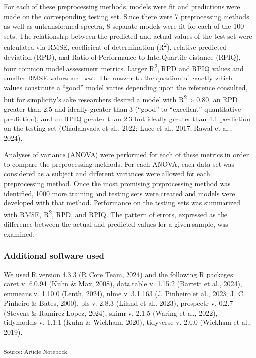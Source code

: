 \documentclass[
]{agujournal2019}
\begin{document}
For each of these preprocessing methods, models were fit and predictions
were made on the corresponding testing set. Since there were 7
preprocessing methods as well as untransformed spectra, 8 separate
models were fit for each of the 100 sets. The relationship between the
predicted and actual values of the test set were calculated via RMSE,
coefficient of determination (R\textsuperscript{2}), relative predicted
deviation (RPD), and Ratio of Performance to InterQuartile distance
(RPIQ), four common model assessment metrics. Larger
R\textsuperscript{2}, RPD and RPIQ values and smaller RMSE values are
best. The answer to the question of exactly which values constitute a
``good'' model varies depending upon the reference consulted, but for
simplicity's sake researchers desired a model with R\textsuperscript{2}
\textgreater{} 0.80, an RPD greater than 2.5 and ideally greater than 3
(``good'' to ``excellent'' quantitative prediction), and an RPIQ greater
than 2.3 but ideally greater than 4.1 prediction on the testing set
(Chadalavada et al., 2022; Luce et al., 2017; Rawal et al., 2024).

Analyses of variance (ANOVA) were performed for each of these metrics in
order to compare the preprocessing methods. For each ANOVA, each data
set was considered as a subject and different variances were allowed for
each preprocessing method. Once the most promising preprocessing method
was identified, 1000 more training and testing sets were created and
models were developed with that method. Performance on the testing sets
was summarized with RMSE, R\textsuperscript{2}, RPD, and RPIQ. The
pattern of errors, expressed as the difference between the actual and
predicted values for a given sample, was examined.

\subsubsection{Additional software used}\label{additional-software-used}

We used R version 4.3.3 (R Core Team, 2024) and the following R
packages: caret v. 6.0.94 (Kuhn \& Max, 2008), data.table v. 1.15.2
(Barrett et al., 2024), emmeans v. 1.10.0 (Lenth, 2024), nlme v. 3.1.163
(J. Pinheiro et al., 2023; J. C. Pinheiro \& Bates, 2000), pls v. 2.8.3
(Liland et al., 2023), prospectr v. 0.2.7 (Stevens \& Ramirez-Lopez,
2024), skimr v. 2.1.5 (Waring et al., 2022), tidymodels v. 1.1.1 (Kuhn
\& Wickham, 2020), tidyverse v. 2.0.0 (Wickham et al., 2019).

\textsubscript{Source:
\href{https://rvcrawford.github.io/glowing-system/index.qmd.html}{Article
Notebook}}
\end{document}
